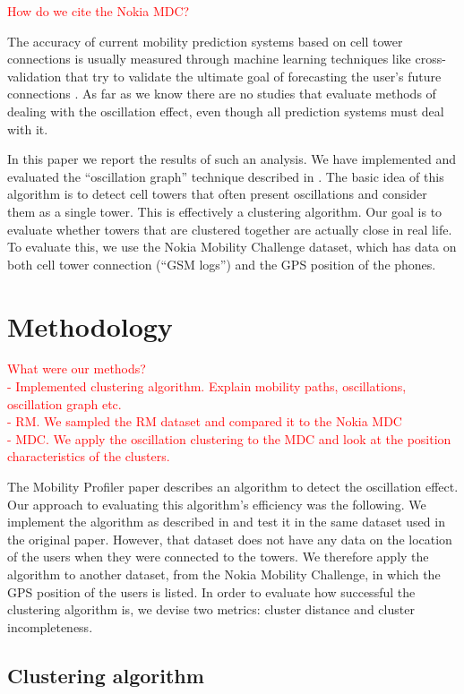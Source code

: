 \documentclass[letterpaper, 11pt, conference]{ieeeconf}
\newcommand{\xxx}[1]{\textcolor{red}{#1}}
\begin{document}
\xxx{How do we cite the Nokia MDC?}

The accuracy of current mobility prediction systems based on cell tower connections is usually measured through machine learning techniques like cross-validation that try to validate the ultimate goal of forecasting the user's future connections \cite{LeapGraph}. As far as we know there are no studies that evaluate methods of dealing with the oscillation effect, even though all prediction systems must deal with it.

In this paper we report the results of such an analysis. We have implemented and evaluated the ``oscillation graph'' technique described in \cite{mobilityprofiler}. The basic idea of this algorithm is to detect cell towers that often present oscillations and consider them as a single tower. This is effectively a clustering algorithm. Our goal is to evaluate whether towers that are clustered together are actually close in real life. To evaluate this, we use the Nokia Mobility Challenge dataset, which has data on both cell tower connection (``GSM logs'') and the GPS position of the phones.

\section{Methodology}
\label{sec:methodology}
\xxx{What were our methods?\\- Implemented clustering algorithm. Explain mobility paths, oscillations, oscillation graph etc. \\- RM. We sampled the RM dataset and compared it to
the Nokia MDC \\- MDC. We apply the oscillation clustering to the MDC and look at the position
characteristics of the clusters.}

The Mobility Profiler paper \cite{mobilityprofiler} describes an algorithm to detect the oscillation effect. Our approach to evaluating this algorithm's efficiency was the following. We implement the algorithm as described in \cite{mobilityprofiler} and test it in the same dataset used in the original paper. However, that dataset does not have any data on the location of the users when they were connected to the towers. We therefore apply the algorithm to another dataset, from the Nokia Mobility Challenge, in which the GPS position of the users is listed. In order to evaluate how successful the clustering algorithm is, we devise two metrics: cluster distance and cluster incompleteness.

\subsection{Clustering algorithm}
\end{document}
